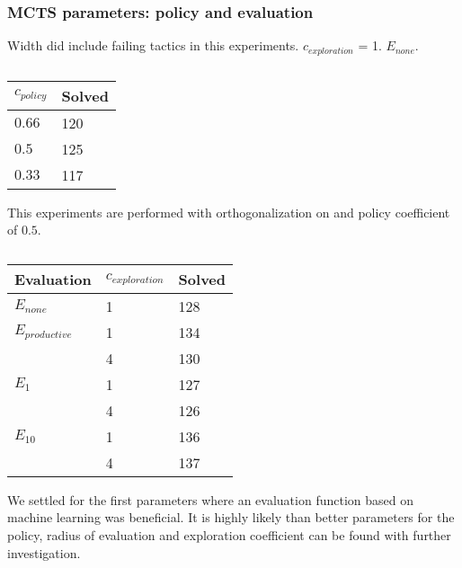\documentclass[runningheads,a4paper,draft]{svjour3}
\newcommand{\ra}[1]{\renewcommand{\arraystretch}{#1}}
\begin{document}
\subsubsection{MCTS parameters: policy and evaluation}

Width did include failing tactics in this experiments. $c_{exploration}$ = 1.
$E_{none}$.

\begin{table}[ht]
\centering\ra{1.3}
\small
\begin{tabular}{ll}
\toprule
 $c_{policy}$ & Solved \\
\midrule
 $0.66$ & 120\\
 $0.5$ & 125\\
 $0.33$ & 117\\
\bottomrule
\end{tabular}
\caption{\label{tab:cost_param} 
}
\end{table}
 




This experiments are performed with orthogonalization on and policy coefficient 
of $0.5$.

\begin{table}[ht]
\centering\ra{1.3}
\small
\begin{tabular}{lll}
\toprule
 Evaluation & $c_{exploration}$ & Solved \\
\midrule
 $E_{none}$ & 1 & 128\\
 $E_{productive}$ & 1 & 134\\ 
 & 4 & 130\\
 $E_1$ & 1 & 127\\ 
 & 4 & 126\\ 
 $E_{10}$ & 1 & 136\\ 
 & 4 & 137\\ 
\bottomrule
\end{tabular}
\caption{\label{tab:learning} 
}
\end{table}

We settled for the first parameters where an evaluation function based on 
machine learning was beneficial. It is highly likely than better parameters for 
the policy, radius of evaluation and exploration coefficient can be found with 
further investigation.
\end{document}
